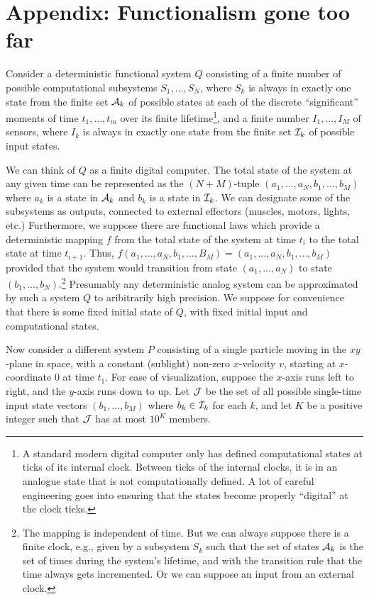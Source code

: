 \section*{Appendix: Functionalism gone too far}
Consider a deterministic functional system $Q$ consisting of a 
finite number of possible computational subsystems $S_1,...,S_N$, where $S_k$ is always in exactly one state from the finite set $\mathcal A_k$
of possible states at each of the discrete ``significant'' moments of time $t_1,...,t_m$ over its finite lifetime\footnote{A standard modern digital computer only has defined 
computational states at ticks of its internal clock. Between ticks of the internal clocks, it is in an analogue state that is not
computationally defined. A lot of careful engineering goes into ensuring that the states become properly ``digital'' at the clock ticks.}, and 
a finite number $I_1,...,I_M$ of sensors, where $I_k$ is always in exactly one state from the finite set $\mathcal I_k$ of possible input
states.

We can think of $Q$ as a finite digital computer. The total state of the system at any given time can be represented as the
$(N+M)$-tuple $(a_1,...,a_N,b_1,...,b_M)$ where $a_k$ is a state in $\mathcal A_k$ and $b_k$ is a state in $\mathcal I_k$. We can designate some of
the subsystems as outputs, connected to external effectors (muscles, motors, lights, etc.)  Furthermore, we suppose there are functional laws which provide a 
deterministic mapping $f$ from the total state of the system at time $t_i$ to the total state at time $t_{i+1}$. Thus, $f(a_1,...,a_N,b_1,...,B_M)= (a_1,...,a_N,b_1,...,b_M)$ 
provided that the system would transition from state $(a_1,...,a_N)$ to state $(b_1,...,b_N)$.\footnote{The mapping is independent of time. But we 
can always suppose there is a finite clock, e.g., given by a subsystem $S_k$ such that the set of states $\mathcal A_k$ is
the set of times during the system's lifetime, and with the transition rule that the time always gets incremented. Or we can suppose an input
from an external clock.} Presumably any deterministic analog system can be approximated by such a system $Q$ to aribitrarily high precision.
We suppose for convenience that there is some fixed initial state of $Q$, with fixed initial input and computational states.

Now consider a different system $P$ consisting of a single particle moving in the $xy$-plane in space, with a constant 
(sublight) non-zero $x$-velocity $v$, starting at $x$-coordinate $0$ at time $t_1$. For ease of visualization, suppose the $x$-axis
runs left to right, and the $y$-axis runs down to up.
Let $\mathcal J$ be the set of all possible
single-time input state vectors $(b_1,...,b_M)$ where $b_k \in\mathcal I_k$ for each $k$, and let $K$ be a positive integer such
that $\mathcal J$ has at most $10^K$ members. 

